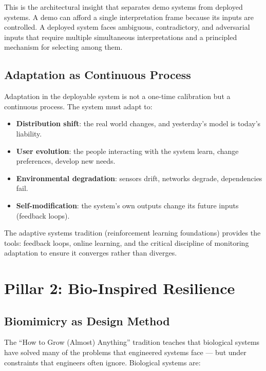 \documentclass[11pt,a4paper]{article}
\begin{document}
This is the architectural insight that separates demo systems from deployed systems. A demo can afford a single interpretation frame because its inputs are controlled. A deployed system faces ambiguous, contradictory, and adversarial inputs that require multiple simultaneous interpretations and a principled mechanism for selecting among them.

\subsection{Adaptation as Continuous Process}

Adaptation in the deployable system is not a one-time calibration but a continuous process. The system must adapt to:

\begin{itemize}[leftmargin=*, itemsep=2pt]
  \item \textbf{Distribution shift}: the real world changes, and yesterday's model is today's liability.
  \item \textbf{User evolution}: the people interacting with the system learn, change preferences, develop new needs.
  \item \textbf{Environmental degradation}: sensors drift, networks degrade, dependencies fail.
  \item \textbf{Self-modification}: the system's own outputs change its future inputs (feedback loops).
\end{itemize}

The adaptive systems tradition (reinforcement learning foundations) provides the tools: feedback loops, online learning, and the critical discipline of monitoring adaptation to ensure it converges rather than diverges.

\section{Pillar 2: Bio-Inspired Resilience}

\subsection{Biomimicry as Design Method}

The ``How to Grow (Almost) Anything'' tradition teaches that biological systems have solved many of the problems that engineered systems face --- but under constraints that engineers often ignore. Biological systems are:
\end{document}
